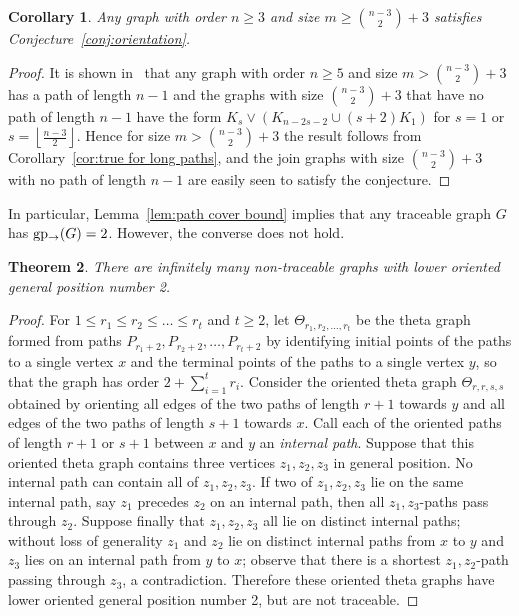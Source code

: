 \documentclass[a4paper,12pt]{article}
\newtheorem{theorem}{Theorem}[section]
\newtheorem{corollary}[theorem]{Corollary}
\theoremstyle{definition}
\newcommand{\lgp}{{\rm gp_{\rightarrow }}}
\begin{document}
	\begin{corollary}
		Any graph with order $n \geq 3$ and size $m \geq \binom{n-3}{2}+3$ satisfies Conjecture~\ref{conj:orientation}.
	\end{corollary}
	\begin{proof}
		It is shown in~\cite{Balister} that any graph with order $n \geq 5$ and size $m > \binom{n-3}{2}+3$ has a path of length $n-1$ and the graphs with size $\binom{n-3}{2}+3$ that have no path of length $n-1$ have the form $K_s \vee (K_{n-2s-2} \cup (s+2)K_1)$ for $s = 1$ or $s = \left \lfloor \frac{n-3}{2} \right \rfloor $. Hence for size $m > \binom{n-3}{2}+3$ the result follows from Corollary~\ref{cor:true for long paths}, and the join graphs with size $\binom{n-3}{2}+3$ with no path of length $n-1$ are easily seen to satisfy the conjecture.
	\end{proof}
	
	In particular, Lemma~\ref{lem:path cover bound} implies that any traceable graph $G$ has $\lgp (G) = 2$. However, the converse does not hold. 
	
	\begin{theorem}
		There are infinitely many non-traceable graphs with lower oriented general position number 2.
	\end{theorem}
	\begin{proof}
		For $1 \leq r_1 \leq r_2 \leq \dots \leq r_t$ and $t \geq 2$, let $\Theta _{r_1,r_2,\dots ,r_t}$ be the theta graph formed from paths $P_{r_1+2},P_{r_2+2}, \ldots ,P_{r_t+2}$ by identifying initial points of the paths to a single vertex $x$ and the terminal points of the paths to a single vertex $y$, so that the graph has order $2+\sum _{i=1}^tr_i$. Consider the oriented theta graph $\Theta _{r,r,s,s}$ obtained by orienting all edges of the two paths of length $r+1$ towards $y$ and all edges of the two paths of length $s+1$ towards $x$. Call each of the oriented paths of length $r+1$ or $s+1$ between $x$ and $y$ an \emph{internal path}. Suppose that this oriented theta graph contains three vertices $z_1,z_2,z_3$ in general position. No internal path can contain all of $z_1,z_2,z_3$. If two of $z_1,z_2,z_3$ lie on the same internal path, say $z_1$ precedes $z_2$ on an internal path, then all $z_1,z_3$-paths pass through $z_2$. Suppose finally that $z_1,z_2,z_3$ all lie on distinct internal paths; without loss of generality $z_1$ and $z_2$ lie on distinct internal paths from $x$ to $y$ and $z_3$ lies on an internal path from $y$ to $x$; observe that there is a shortest $z_1,z_2$-path passing through $z_3$, a contradiction. Therefore these oriented theta graphs have lower oriented general position number 2, but are not traceable. 
	\end{proof}
	
\end{document}
